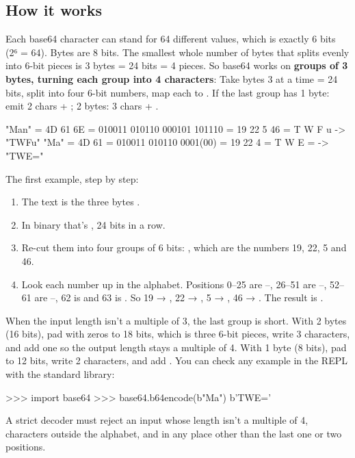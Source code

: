 \documentclass[10pt,a4paper]{article}
\begin{document}
\subsection{How it works}
Each base64 character can stand for 64 different values, which is exactly 6 bits (2⁶ = 64). Bytes are 8 bits. The smallest whole number of bytes that splits evenly into 6-bit pieces is 3 bytes = 24 bits = 4 pieces. So base64 works on \textbf{groups of 3 bytes, turning each group into 4 characters}:
Take bytes 3 at a time = 24 bits, split into four 6-bit numbers, map each to . If the last group has 1 byte: emit 2 chars + \code{=\allowbreak{}=\allowbreak{}}; 2 bytes: 3 chars + \code{=\allowbreak{}}.
\begin{txtcode}
"Man" = 4D 61 6E = 010011 010110 000101 101110 = 19 22 5 46 = T W F u -> "TWFu"
"Ma"  = 4D 61    = 010011 010110 0001(00)      = 19 22 4    = T W E = -> "TWE="
\end{txtcode}
The first example, step by step:
\begin{enumerate}
\item The text  is the three bytes .
\item In binary that’s , 24 bits in a row.
\item Re-cut them into four groups of 6 bits:    , which are the numbers 19, 22, 5 and 46.
\item Look each number up in the alphabet. Positions 0–25 are –, 26–51 are –, 52–61 are –, 62 is \code{+} and 63 is \code{/\allowbreak{}}. So 19 → , 22 → , 5 → , 46 → . The result is .
\end{enumerate}
When the input length isn’t a multiple of 3, the last group is short. With 2 bytes (16 bits), pad with zeros to 18 bits, which is three 6-bit pieces, write 3 characters, and add one \code{=\allowbreak{}} so the output length stays a multiple of 4. With 1 byte (8 bits), pad to 12 bits, write 2 characters, and add \code{=\allowbreak{}=\allowbreak{}}.
You can check any example in the REPL with the standard library:
\begin{txtcode}
>>> import base64
>>> base64.b64encode(b"Ma")
b'TWE='
\end{txtcode}
A strict decoder must reject an input whose length isn’t a multiple of 4, characters outside the alphabet, and \code{=\allowbreak{}} in any place other than the last one or two positions.
\setcounter{section}{4}
\end{document}
